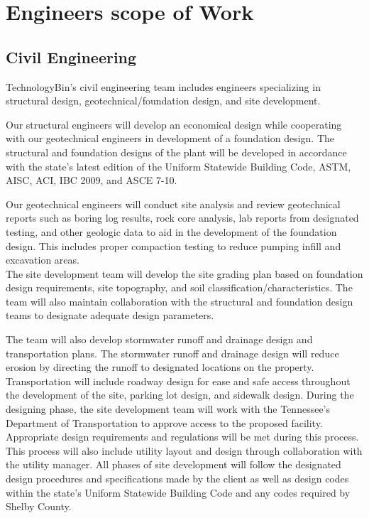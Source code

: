 \documentclass{ceri}
\begin{document}
\section{Engineers scope of Work}


\subsection{Civil Engineering}
TechnologyBin’s civil engineering team includes engineers specializing in structural design, geotechnical/foundation design, and site development.\\
\newline

Our structural engineers will develop an economical design while cooperating with our geotechnical engineers in development of a foundation design. The structural and foundation designs of the plant will be developed in accordance with the state’s latest edition of the Uniform Statewide Building Code, ASTM, AISC, ACI, IBC 2009, and ASCE 7-10.\\
\newline

Our geotechnical engineers will conduct site analysis and review geotechnical reports such as boring log results, rock core analysis, lab reports from designated testing, and other geologic data to aid in the development of the foundation design. This includes proper compaction testing to reduce pumping infill and excavation areas.\\
\newline
The site development team will develop the site grading plan based on foundation design requirements, site topography, and soil classification/characteristics. The team will also maintain collaboration with the structural and foundation design teams to designate adequate design parameters.\\
\newline

The team will also develop stormwater runoff and drainage design and transportation plans. The stormwater runoff and drainage design will reduce erosion by directing the runoff to designated locations on the property. Transportation will include roadway design for ease and safe access throughout the development of the site, parking lot design, and sidewalk design. During the designing phase, the site development team will work with the Tennessee’s Department of Transportation to approve access to the proposed facility. Appropriate design requirements and regulations will be met during this process. This process will also include utility layout and design through collaboration with the utility manager.
\newpage
All phases of site development will follow the designated design procedures and specifications made by the client as well as design codes within the state’s Uniform Statewide Building Code and any codes required by Shelby County. 
\end{document}
